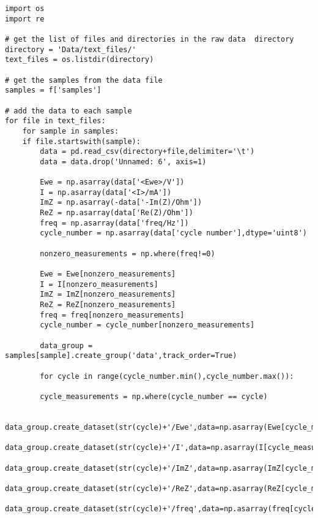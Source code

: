 \documentclass[11pt]{article}
\begin{document}
\begin{verbatim}
import os
import re

# get the list of files and directories in the raw data  directory
directory = 'Data/text_files/'
text_files = os.listdir(directory)

# get the samples from the data file
samples = f['samples']

# add the data to each sample
for file in text_files:
    for sample in samples:
	if file.startswith(sample):
	    data = pd.read_csv(directory+file,delimiter='\t')
	    data = data.drop('Unnamed: 6', axis=1)

	    Ewe = np.asarray(data['<Ewe>/V'])
	    I = np.asarray(data['<I>/mA'])
	    ImZ = np.asarray(-data['-Im(Z)/Ohm'])
	    ReZ = np.asarray(data['Re(Z)/Ohm'])
	    freq = np.asarray(data['freq/Hz'])
	    cycle_number = np.asarray(data['cycle number'],dtype='uint8')

	    nonzero_measurements = np.where(freq!=0)

	    Ewe = Ewe[nonzero_measurements]
	    I = I[nonzero_measurements]
	    ImZ = ImZ[nonzero_measurements]
	    ReZ = ReZ[nonzero_measurements]
	    freq = freq[nonzero_measurements]
	    cycle_number = cycle_number[nonzero_measurements]

	    data_group = samples[sample].create_group('data',track_order=True)

	    for cycle in range(cycle_number.min(),cycle_number.max()):

		cycle_measurements = np.where(cycle_number == cycle)

		data_group.create_dataset(str(cycle)+'/Ewe',data=np.asarray(Ewe[cycle_measurements]))
		data_group.create_dataset(str(cycle)+'/I',data=np.asarray(I[cycle_measurements]))
		data_group.create_dataset(str(cycle)+'/ImZ',data=np.asarray(ImZ[cycle_measurements]))
		data_group.create_dataset(str(cycle)+'/ReZ',data=np.asarray(ReZ[cycle_measurements]))
		data_group.create_dataset(str(cycle)+'/freq',data=np.asarray(freq[cycle_measurements]))
\end{verbatim}
\end{document}
